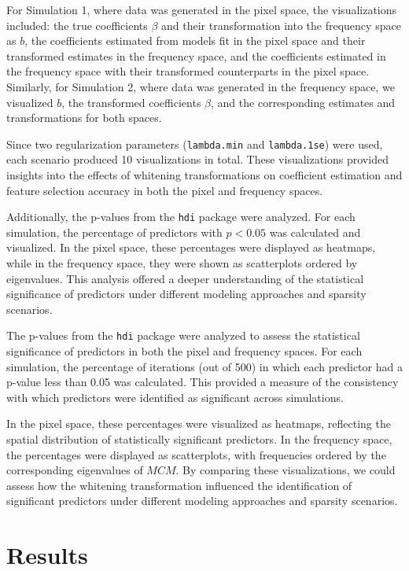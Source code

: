 \documentclass[12pt]{article}
\begin{document}
For Simulation 1, where data was generated in the pixel space, the visualizations included: the true coefficients \( \beta \) and their transformation into the frequency space as \( b \), the coefficients estimated from models fit in the pixel space and their transformed estimates in the frequency space, and the coefficients estimated in the frequency space with their transformed counterparts in the pixel space. Similarly, for Simulation 2, where data was generated in the frequency space, we visualized \( b \), the transformed coefficients \( \beta \), and the corresponding estimates and transformations for both spaces.

Since two regularization parameters (\texttt{lambda.min} and \texttt{lambda.1se}) were used, each scenario produced 10 visualizations in total. These visualizations provided insights into the effects of whitening transformations on coefficient estimation and feature selection accuracy in both the pixel and frequency spaces.

Additionally, the p-values from the \texttt{hdi} package were analyzed. For each simulation, the percentage of predictors with \( p < 0.05 \) was calculated and visualized. In the pixel space, these percentages were displayed as heatmaps, while in the frequency space, they were shown as scatterplots ordered by eigenvalues. This analysis offered a deeper understanding of the statistical significance of predictors under different modeling approaches and sparsity scenarios.

The p-values from the \texttt{hdi} package were analyzed to assess the statistical significance of predictors in both the pixel and frequency spaces. For each simulation, the percentage of iterations (out of 500) in which each predictor had a p-value less than 0.05 was calculated. This provided a measure of the consistency with which predictors were identified as significant across simulations.

In the pixel space, these percentages were visualized as heatmaps, reflecting the spatial distribution of statistically significant predictors. In the frequency space, the percentages were displayed as scatterplots, with frequencies ordered by the corresponding eigenvalues of \( MCM \). By comparing these visualizations, we could assess how the whitening transformation influenced the identification of significant predictors under different modeling approaches and sparsity scenarios.



\section{Results}
\end{document}
